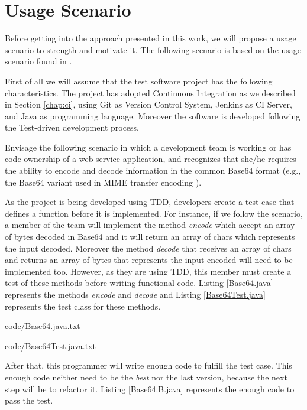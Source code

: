 \chapter{Usage Scenario}
\label{usage-scenario}
Before getting into the approach presented in this work, we will propose a usage scenario to strength and motivate it. The following scenario is based on the usage scenario found in \cite{Kessel2016}.

First of all we will assume that the test software project has the following characteristics. The project has adopted Continuous Integration as we described in Section \ref{chap:ci}, using Git as Version Control System, Jenkins as CI Server, and Java as programming language. Moreover the software is developed following the Test-driven development process.

Envisage the following scenario in which a development team is working or has code ownership of a web service application, and recognizes that she/he requires the ability to encode and decode information in the common Base64 format (e.g., the Base64 variant used in MIME transfer encoding \cite{rfc2045}).

As the project is being developed using TDD, developers create a test case that defines a function before it is implemented. For instance, if we follow the scenario, a member of the team will implement the method \emph{encode} which accept an array of bytes decoded in Base64 and it will return an array of chars which represents the input decoded. Moreover the method \emph{decode} that receives an array of chars and returns an array of bytes that represents the input encoded will need to be implemented too. However, as they are using TDD, this member must create a test of these methods before writing functional code. Listing \ref{Base64.java} represents the methods \emph{encode} and \emph{decode} and Listing \ref{Base64Test.java} represents the test class for these methods.


{code/Base64.java.txt}


{code/Base64Test.java.txt}

After that, this programmer will write enough code to fulfill the test case. This enough code neither need to be the \emph{best} nor the last version, because the next step will be to refactor it. Listing \ref{Base64.B.java} represents the enough code to pass the test.

